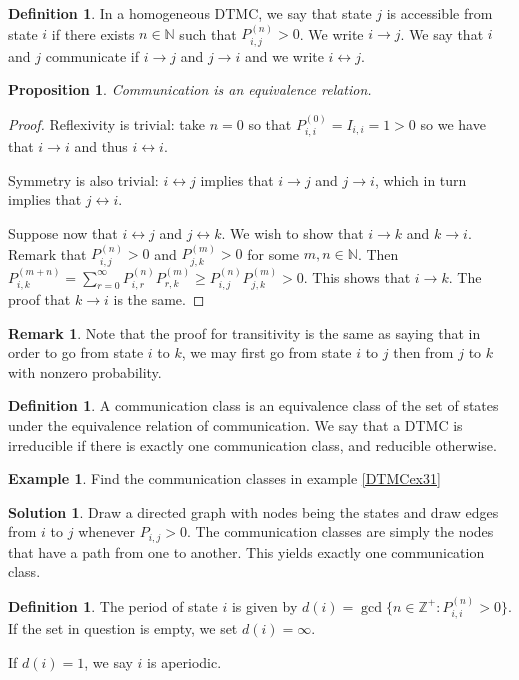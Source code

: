 \documentclass[11pt]{amsart}
\newtheorem{proposition}[theorem]{Proposition}
\theoremstyle{definition}
\newtheorem{definition}[theorem]{Definition}
\newtheorem{remark}[theorem]{Remark}
\newtheorem{example}[theorem]{Example}
\newtheorem{solution}[theorem]{Solution}
\numberwithin{equation}{section}
\begin{document}
 \begin{definition}
     In a homogeneous DTMC, we say that state $j$ is accessible from state $i$ if there exists $n\in\mathbb N$ such that $P_{i,j}^{(n)}>0$. We write $i\to j$. We say that $i$ and $j$ communicate if $i\to j$ and $j\to i$ and we write $i\leftrightarrow j$.
 \end{definition}
 \begin{proposition}
     Communication is an equivalence relation.
 \end{proposition}
 \begin{proof}
     Reflexivity is trivial: take $n=0$ so that $P_{i,i}^{(0)}=I_{i,i}=1>0$ so we have that $i\to i$ and thus $i\leftrightarrow i$.

     Symmetry is also trivial: $i\leftrightarrow j$ implies that $i\to j$ and $j\to i$, which in turn implies that $j\leftrightarrow i$.

     Suppose now that $i\leftrightarrow j$ and $j\leftrightarrow k$. We wish to show that $i\to k$ and $k\to i$. Remark that $P_{i,j}^{(n)}>0$ and $P_{j,k}^{(m)}>0$ for some $m,n\in\mathbb N$. Then $P_{i,k}^{(m+n)}=\sum_{r=0}^\infty P_{i,r}^{(n)}P_{r,k}^{(m)}\ge P_{i,j}^{(n)}P_{j,k}^{(m)}>0$. This shows that $i\to k$. The proof that $k\to i$ is the same.
 \end{proof}
 \begin{remark}
     Note that the proof for transitivity is the same as saying that in order to go from state $i$ to $k$, we may first go from state $i$ to $j$ then from $j$ to $k$ with nonzero probability.
 \end{remark}
 \begin{definition}
     A communication class is an equivalence class of the set of states under the equivalence relation of communication. We say that a DTMC is irreducible if there is exactly one communication class, and reducible otherwise.
 \end{definition}
 \begin{example}
     Find the communication classes in example \ref{DTMCex31}
 \end{example}
 \addtocounter{theorem}{-1}
 \begin{solution}
     Draw a directed graph with nodes being the states and draw edges from $i$ to $j$ whenever $P_{i,j}>0$. The communication classes are simply the nodes that have a path from one to another. This yields exactly one communication class.
 \end{solution}
 \begin{definition}
     The period of state $i$ is given by $d(i)=\gcd\{n\in\mathbb Z^+:P_{i,i}^{(n)}>0\}$. If the set in question is empty, we set $d(i)=\infty$.

     If $d(i)=1$, we say $i$ is aperiodic.
 \end{definition}
\end{document}
